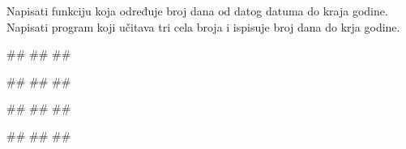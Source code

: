 \begin{Exercise}[label=p1.4_] 
Napisati funkciju  koja određuje broj dana od datog datuma do kraja
godine. Napisati program koji učitava tri cela broja i ispisuje broj
dana do krja godine.

\begin{miditest}
\begin{upotreba}{1}
#\naslovInt#
##
##
\end{upotreba}
\end{miditest}
\begin{miditest}
\begin{upotreba}{2}
#\naslovInt#
##
##
\end{upotreba}
\end{miditest}

\begin{miditest}
\begin{upotreba}{3}
#\naslovInt#
##
##
\end{upotreba}
\end{miditest}
\begin{miditest}
\begin{upotreba}{4}
#\naslovInt#
##
##
\end{upotreba}
\end{miditest}

 
\end{Exercise}
\begin{Answer}[ref=p1.4_]
\end{Answer}


